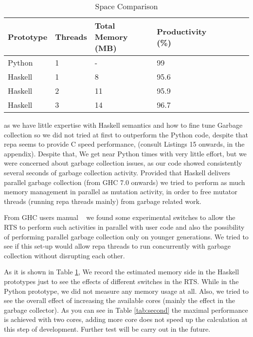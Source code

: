 \documentclass{tmr}
\begin{document}
\begin{table}[float,captionpos=b,belowcaptionskip=4pt]
\begin{center}
    \begin{tabular}{ | l | l | l | l | l | l | l| l |}
\hline  Prototype & Threads & Total Memory (MB) & Productivity (\%) \\ 
\hline  Python  & 1 & -  & 99   \\
\hline  Haskell & 1 & 8  & 95.6  \\
\hline  Haskell & 2 & 11 & 95.9  \\
\hline  Haskell & 3 & 14 & 96.7   \\
\hline
    \end{tabular} 
\end{center}
\label{tab:first}
\caption{Space Comparison}
\end{table}

as we have little expertise with Haskell semantics and 
how to fine tune Garbage collection so we did not tried at first to outperform the Python
code, despite that repa seems to provide C speed performance, (consult Listings 15 onwards, in the appendix).
Despite that, We get near Python times with very little effort, but we were concerned about garbage collection 
issues, as our code showed consistently several seconds of garbage collection activity. Provided that Haskell
delivers parallel garbage collection (from GHC 7.0 onwards) we tried to perform as much memory management in parallel
as mutation activity, in order to free mutator threads (running repa threads mainly) from garbage related work.

From GHC users manual ~\cite{ghc} we found some experimental switches to allow the RTS to perform such activities in parallel
with user code and also the possibility of performing parallel garbage collection only on younger generations.
We tried to see if this set-up would allow repa threads to run concurrently with garbage collection without  
disrupting each other.

As it is shown in Table \ref{tab:first}, We record the estimated memory side in the 
Haskell prototypes just to see the effects of different switches in the RTS. While in the Python
prototype, we did not measure any memory usage at all. Also, we tried to see the overall effect of 
increasing the available cores (mainly the effect in the garbage collector). As you can see in Table
\ref{tab:second} the maximal performance is achieved with two cores, adding more core does not speed up
the calculation at this step of development. Further test will be carry out in the future.
 
\end{document}
